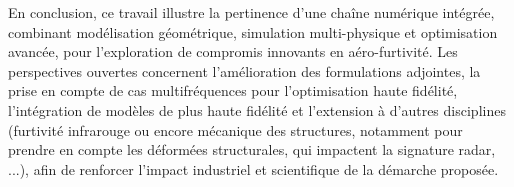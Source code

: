 En conclusion, ce travail illustre la pertinence d'une chaîne numérique intégrée, combinant modélisation géométrique, simulation multi-physique et optimisation avancée, pour l'exploration de compromis innovants en aéro-furtivité. Les perspectives ouvertes concernent l'amélioration des formulations adjointes, la prise en compte de cas multifréquences pour l'optimisation haute fidélité, l'intégration de modèles de plus haute fidélité et l'extension à d'autres disciplines (furtivité infrarouge ou encore mécanique des structures, notamment pour prendre en compte les déformées structurales, qui impactent la signature radar,  ...), afin de renforcer l'impact industriel et scientifique de la démarche proposée.
